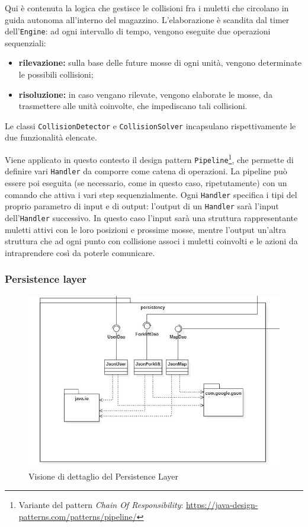 Qui è contenuta la logica che gestisce le collisioni fra i muletti che circolano in guida autonoma all'interno del magazzino. L'elaborazione è scandita dal timer dell'\texttt{Engine}: ad ogni intervallo di tempo, vengono eseguite due operazioni sequenziali:
\begin{itemize}
	\item \textbf{rilevazione:} sulla base delle future mosse di ogni unità, vengono determinate le possibili collisioni;
	\item \textbf{risoluzione:} in caso vengano rilevate, vengono elaborate le mosse, da trasmettere alle unità coinvolte, che impediscano tali collisioni.
\end{itemize}
Le classi \texttt{CollisionDetector} e \texttt{CollisionSolver} incapsulano rispettivamente le due funzionalità elencate.

Viene applicato in questo contesto il design pattern \texttt{Pipeline}\footnote{Variante del pattern \textit{Chain Of Responsibility}: \url{https://java-design-patterns.com/patterns/pipeline/}}, che permette di definire vari \texttt{Handler} da comporre come catena di operazioni. La pipeline può essere poi eseguita (se necessario, come in questo caso, ripetutamente) con un comando che attiva i vari step sequenzialmente. Ogni \texttt{Handler} specifica i tipi del proprio parametro di input e di output: l'output di un \texttt{Handler} sarà l'input dell'\texttt{Handler} successivo.
In questo caso l'input sarà una struttura rappresentante muletti attivi con le loro posizioni e prossime mosse, mentre l'output un'altra struttura che ad ogni punto con collisione associ i muletti coinvolti e le azioni da intraprendere così da poterle comunicare.



\subsubsection{Persistence layer}

\begin{figure}[H]
	\centering
	\includegraphics[scale=0.50]{res/diagrams/server/server_persistency.jpg}
	\caption{Visione di dettaglio del Persistence Layer}
\end{figure}

